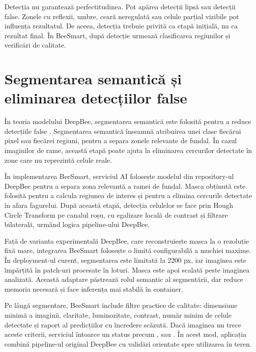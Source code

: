Detecția nu garantează perfectitudinea. Pot apărea detecții lipsă sau detecții false. Zonele cu reflexii, umbre, ceară neregulată sau celule parțial vizibile pot influența rezultatul. De aceea, detecția trebuie privită ca etapă inițială, nu ca rezultat final. În BeeSmart, după detecție urmează clasificarea regiunilor și verificări de calitate.

\section{Segmentarea semantică și eliminarea detecțiilor false}

În teoria modelului DeepBee, segmentarea semantică este folosită pentru a reduce detecțiile false \cite{deepbeeArticle}. Segmentarea semantică înseamnă atribuirea unei clase fiecărui pixel sau fiecărei regiuni, pentru a separa zonele relevante de fundal. În cazul imaginilor de rame, această etapă poate ajuta la eliminarea cercurilor detectate în zone care nu reprezintă celule reale.

În implementarea BeeSmart, serviciul AI folosește modelul  din repository-ul DeepBee pentru a separa zona relevantă a ramei de fundal. Masca obținută este folosită pentru a calcula regiunea de interes și pentru a elimina cercurile detectate în afara fagurelui. După această etapă, detecția celulelor se face prin Hough Circle Transform pe canalul roșu, cu egalizare locală de contrast și filtrare bilaterală, urmând logica pipeline-ului DeepBee.

Față de varianta experimentală DeepBee, care reconstruiește masca la o rezoluție fixă mare, integrarea BeeSmart folosește o limită configurabilă a muchiei maxime. În deployment-ul curent, segmentarea este limitată la 2200 px, iar imaginea este împărțită în patch-uri procesate în loturi. Masca este apoi scalată peste imaginea analizată. Această adaptare păstrează rolul semantic al segmentării, dar reduce memoria necesară și face inferența mai stabilă în container.

Pe lângă segmentare, BeeSmart include filtre practice de calitate: dimensiune minimă a imaginii, claritate, luminozitate, contrast, număr minim de celule detectate și raport al predicțiilor cu încredere scăzută. Dacă imaginea nu trece aceste criterii, serviciul întoarce un status precum ,  sau . În acest mod, aplicația combină pipeline-ul original DeepBee cu validări orientate spre utilizarea în teren.

